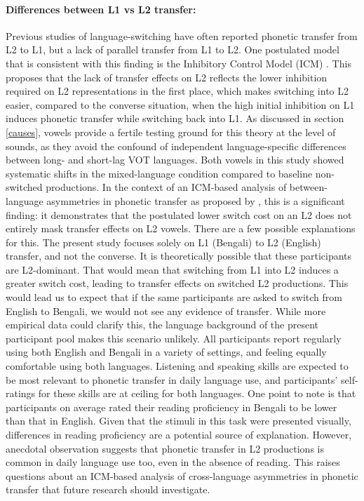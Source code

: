 \documentclass[12 pt]{article}
\begin{document}
\paragraph{Differences between L1 vs L2 transfer:}
Previous studies of language-switching have often reported phonetic transfer from L2 to L1, but a lack of parallel transfer from L1 to L2. One postulated model that is consistent with this finding is the Inhibitory Control Model (ICM) \cite{green1986control,olson2013bilingual,tsui2019impact}. This proposes that the lack of transfer effects on L2 reflects the lower inhibition required on L2 representations in the first place, which makes switching into L2 easier, compared to the converse situation, when the high initial inhibition on L1 induces phonetic transfer while switching back into L1.  As discussed in section \ref{causes}, vowels provide a fertile testing ground for this theory at the level of sounds, as they avoid the confound of independent language-specific differences between long- and short-lag VOT languages. Both vowels in this study showed systematic shifts in the mixed-language condition compared to baseline non-switched productions. In the context of an ICM-based analysis of between-language asymmetries in phonetic transfer as proposed by \cite{olson2013bilingual}, this is a significant finding: it demonstrates that the postulated lower switch cost on an L2 does not entirely mask transfer effects on L2 vowels. There are a few possible explanations for this. The present study focuses solely on L1 (Bengali) to L2 (English) transfer, and not the converse. It is theoretically possible that these participants are L2-dominant. That would mean that switching from L1 into L2 induces a greater switch cost, leading to transfer effects on switched L2 productions. This would lead us to expect that if the same participants are asked to switch from English to Bengali, we would not see any evidence of transfer. While more empirical data could clarify this, the language background of the present participant pool makes this scenario unlikely. All participants report regularly using both English and Bengali in a variety of settings, and feeling equally comfortable using both languages. Listening and speaking skills are expected to be most relevant to phonetic transfer in daily language use, and participants' self-ratings for these skills are at ceiling for both languages. One point to note is that participants on average rated their reading proficiency in Bengali to be lower than that in English. Given that the stimuli in this task were presented visually, differences in reading proficiency are a potential source of explanation. However, anecdotal observation suggests that phonetic transfer in L2 productions is common in daily language use too, even in the absence of reading. This raises questions about an ICM-based analysis of cross-language asymmetries in phonetic transfer that future research should investigate.
\end{document}
